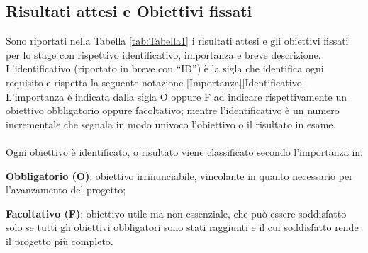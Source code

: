 \subsection{Risultati attesi e Obiettivi fissati}
Sono riportati nella Tabella \ref{tab:Tabella1} i risultati attesi e gli obiettivi fissati per lo stage con rispettivo identificativo, importanza e breve descrizione.
L'identificativo (riportato in breve con “ID”) è la sigla che identifica ogni requisito e rispetta la seguente notazione [Importanza][Identificativo]. \\
L’importanza è indicata dalla sigla O oppure F ad indicare rispettivamente un obiettivo
obbligatorio oppure facoltativo; mentre l’identificativo è un numero incrementale che
segnala in modo univoco l’obiettivo o il risultato in esame.\\
\\
Ogni obiettivo è identificato, o risultato viene classificato secondo l'importanza in: 
\begin{list}{*}{}
    \item \textbf{Obbligatorio (O)}: obiettivo irrinunciabile, vincolante in quanto necessario per l'avanzamento del progetto;
    \item \textbf{Facoltativo (F)}: obiettivo utile ma non essenziale, che può essere soddisfatto solo se tutti gli obiettivi obbligatori sono stati raggiunti e il cui soddisfatto rende il progetto più completo.     
\end{list} 

